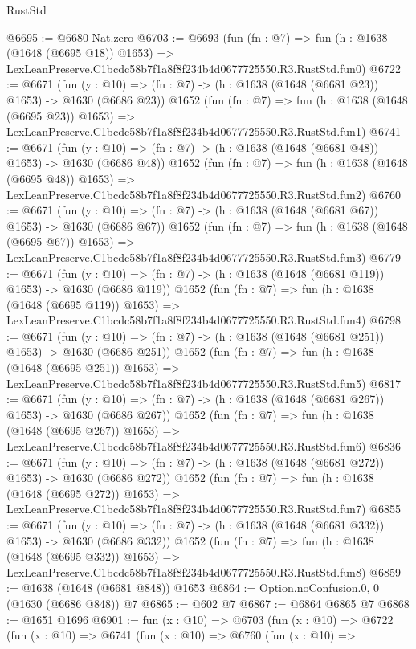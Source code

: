 \begin{lexlean}{RustStd}
\begin{coremodule}
@6695 := @6680 Nat.zero
@6703 := @6693
    (fun (fn : @7) =>
    fun (h : @1638 (@1648 (@6695 @18)) @1653) =>
    LexLeanPreserve.C1bcdc58b7f1a8f8f234b4d0677725550.R3.RustStd.fun0)
@6722 := @6671
    (fun (y : @10) => (fn : @7) -> (h : @1638 (@1648 (@6681 @23)) @1653) -> @1630 (@6686 @23))
    @1652
    (fun (fn : @7) =>
    fun (h : @1638 (@1648 (@6695 @23)) @1653) =>
    LexLeanPreserve.C1bcdc58b7f1a8f8f234b4d0677725550.R3.RustStd.fun1)
@6741 := @6671
    (fun (y : @10) => (fn : @7) -> (h : @1638 (@1648 (@6681 @48)) @1653) -> @1630 (@6686 @48))
    @1652
    (fun (fn : @7) =>
    fun (h : @1638 (@1648 (@6695 @48)) @1653) =>
    LexLeanPreserve.C1bcdc58b7f1a8f8f234b4d0677725550.R3.RustStd.fun2)
@6760 := @6671
    (fun (y : @10) => (fn : @7) -> (h : @1638 (@1648 (@6681 @67)) @1653) -> @1630 (@6686 @67))
    @1652
    (fun (fn : @7) =>
    fun (h : @1638 (@1648 (@6695 @67)) @1653) =>
    LexLeanPreserve.C1bcdc58b7f1a8f8f234b4d0677725550.R3.RustStd.fun3)
@6779 := @6671
    (fun (y : @10) => (fn : @7) -> (h : @1638 (@1648 (@6681 @119)) @1653) -> @1630 (@6686 @119))
    @1652
    (fun (fn : @7) =>
    fun (h : @1638 (@1648 (@6695 @119)) @1653) =>
    LexLeanPreserve.C1bcdc58b7f1a8f8f234b4d0677725550.R3.RustStd.fun4)
@6798 := @6671
    (fun (y : @10) => (fn : @7) -> (h : @1638 (@1648 (@6681 @251)) @1653) -> @1630 (@6686 @251))
    @1652
    (fun (fn : @7) =>
    fun (h : @1638 (@1648 (@6695 @251)) @1653) =>
    LexLeanPreserve.C1bcdc58b7f1a8f8f234b4d0677725550.R3.RustStd.fun5)
@6817 := @6671
    (fun (y : @10) => (fn : @7) -> (h : @1638 (@1648 (@6681 @267)) @1653) -> @1630 (@6686 @267))
    @1652
    (fun (fn : @7) =>
    fun (h : @1638 (@1648 (@6695 @267)) @1653) =>
    LexLeanPreserve.C1bcdc58b7f1a8f8f234b4d0677725550.R3.RustStd.fun6)
@6836 := @6671
    (fun (y : @10) => (fn : @7) -> (h : @1638 (@1648 (@6681 @272)) @1653) -> @1630 (@6686 @272))
    @1652
    (fun (fn : @7) =>
    fun (h : @1638 (@1648 (@6695 @272)) @1653) =>
    LexLeanPreserve.C1bcdc58b7f1a8f8f234b4d0677725550.R3.RustStd.fun7)
@6855 := @6671
    (fun (y : @10) => (fn : @7) -> (h : @1638 (@1648 (@6681 @332)) @1653) -> @1630 (@6686 @332))
    @1652
    (fun (fn : @7) =>
    fun (h : @1638 (@1648 (@6695 @332)) @1653) =>
    LexLeanPreserve.C1bcdc58b7f1a8f8f234b4d0677725550.R3.RustStd.fun8)
@6859 := @1638 (@1648 (@6681 @848)) @1653
@6864 := Option.noConfusion.{0, 0} (@1630 (@6686 @848)) @7
@6865 := @602 @7
@6867 := @6864 @6865 @7
@6868 := @1651 @1696
@6901 := fun (x : @10) =>
  @6703
    (fun (x : @10) =>
    @6722
      (fun (x : @10) =>
      @6741
        (fun (x : @10) =>
        @6760
          (fun (x : @10) =>

\end{coremodule}
\end{lexlean}
